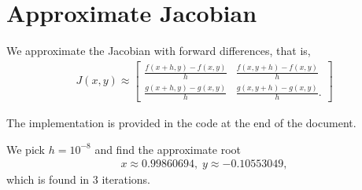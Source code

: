 \documentclass[10pt]{article}
\begin{document}
\section{Approximate Jacobian}
We approximate the Jacobian with forward differences, that is, \begin{align*}
    J(x,y) \approx \begin{bmatrix}
      \frac{f(x+h,y)-f(x,y)}{h} & \frac{f(x, y+h)-f(x, y)}{h} \\
      \frac{g(x+h,y)-g(x,y)}{h} & \frac{g(x, y+h)-g(x, y)}{h}.
    \end{bmatrix}
\end{align*}

The implementation is provided in the code at the end of the document.

We pick \(h = 10^{-8}\) and find the approximate root \begin{align*}
  x \approx 0.99860694, \; y \approx -0.10553049,
\end{align*} which is found in 3 iterations.

{\small }   
\end{document}
